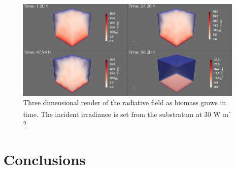 \begin{figure}[tp]
    \centering
    \includegraphics[width=\textwidth,height=0.4\textheight]{Chap4/results/E850_below_3d.png}
    \caption{Three dimensional render of the radiative field as biomass grows in time. The incident irradiance is set from the substratum at 30 W m\textsuperscript{-2}. } 
    \label{fig:3d_below_rad}
\end{figure}












\section{Conclusions}